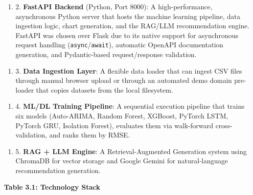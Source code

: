 \documentclass[12pt, a4paper]{report}
\begin{document}
\begin{enumerate}
\item 2. \textbf{FastAPI Backend} (Python, Port 8000): A high-performance, asynchronous Python server that hosts the machine learning pipeline, data ingestion logic, chart generation, and the RAG/LLM recommendation engine. FastAPI was chosen over Flask due to its native support for asynchronous request handling (\texttt{async}/\texttt{await}), automatic OpenAPI documentation generation, and Pydantic-based request/response validation.
\end{enumerate}

\begin{enumerate}
\item 3. \textbf{Data Ingestion Layer}: A flexible data loader that can ingest CSV files through manual browser upload or through an automated demo domain pre-loader that copies datasets from the local filesystem.
\end{enumerate}

\begin{enumerate}
\item 4. \textbf{ML/DL Training Pipeline}: A sequential execution pipeline that trains six models (Auto-ARIMA, Random Forest, XGBoost, PyTorch LSTM, PyTorch GRU, Isolation Forest), evaluates them via walk-forward cross-validation, and ranks them by RMSE.
\end{enumerate}

\begin{enumerate}
\item 5. \textbf{RAG + LLM Engine}: A Retrieval-Augmented Generation system using ChromaDB for vector storage and Google Gemini for natural-language recommendation generation.
\end{enumerate}

\textbf{Table 3.1: Technology Stack}
\end{document}
